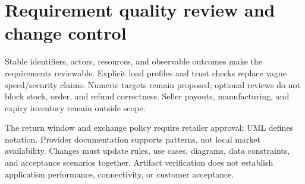 \section{Requirement quality review and change control}
Stable identifiers, actors, resources, and observable outcomes make the requirements reviewable. Explicit load profiles and trust checks replace vague speed/security claims. Numeric targets remain proposed; optional reviews do not block stock, order, and refund correctness. Seller payouts, manufacturing, and expiry inventory remain outside scope.

The return window and exchange policy require retailer approval; UML defines notation. Provider documentation supports patterns, not local market availability. Changes must update rules, use cases, diagrams, data constraints, and acceptance scenarios together. Artifact verification does not establish application performance, connectivity, or customer acceptance.
